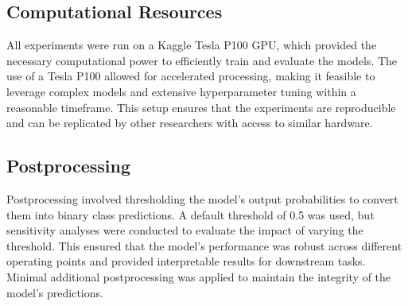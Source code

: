 \subsection{Computational Resources}

All experiments were run on a Kaggle Tesla P100 GPU, which provided the necessary computational power to efficiently train and evaluate the models. The use of a Tesla P100 allowed for accelerated processing, making it feasible to leverage complex models and extensive hyperparameter tuning within a reasonable timeframe. This setup ensures that the experiments are reproducible and can be replicated by other researchers with access to similar hardware.

\subsection{Postprocessing}

Postprocessing involved thresholding the model's output probabilities to convert them into binary class predictions. A default threshold of 0.5 was used, but sensitivity analyses were conducted to evaluate the impact of varying the threshold. This ensured that the model's performance was robust across different operating points and provided interpretable results for downstream tasks. Minimal additional postprocessing was applied to maintain the integrity of the model's predictions.


